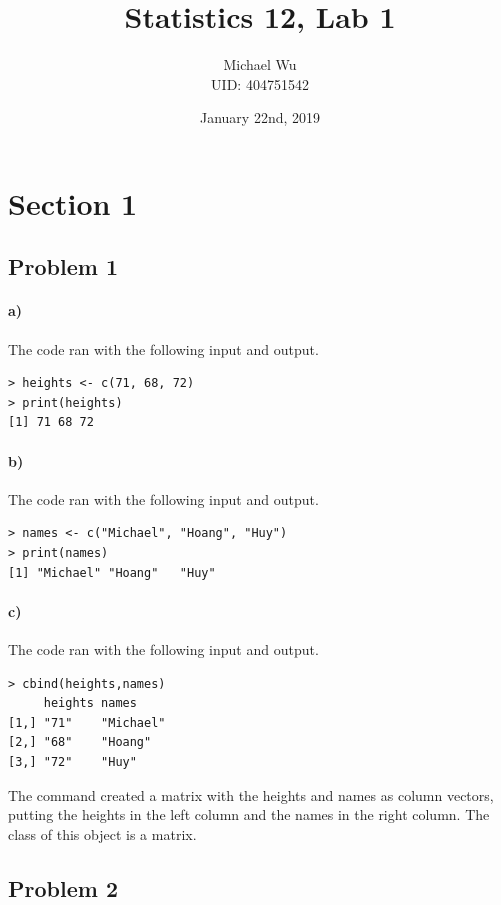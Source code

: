 \documentclass[12pt]{article}
\begin{document}
\title{Statistics 12, Lab 1}
\date{January 22nd, 2019}
\author{Michael Wu\\UID: 404751542}
\maketitle

\section*{Section 1}

\subsection*{Problem 1}

\paragraph{a)}

The code ran with the following input and output.
\begin{verbatim}
> heights <- c(71, 68, 72)
> print(heights)
[1] 71 68 72
\end{verbatim}

\paragraph{b)}

The code ran with the following input and output.
\begin{verbatim}
> names <- c("Michael", "Hoang", "Huy")
> print(names)
[1] "Michael" "Hoang"   "Huy"
\end{verbatim}

\paragraph{c)}

The code ran with the following input and output.
\begin{verbatim}
> cbind(heights,names)
     heights names
[1,] "71"    "Michael"
[2,] "68"    "Hoang"
[3,] "72"    "Huy"
\end{verbatim}
The command created a matrix with the heights and names as column vectors, putting the heights in the left column
and the names in the right column. The class of this object is a matrix.

\subsection*{Problem 2}
\end{document}
